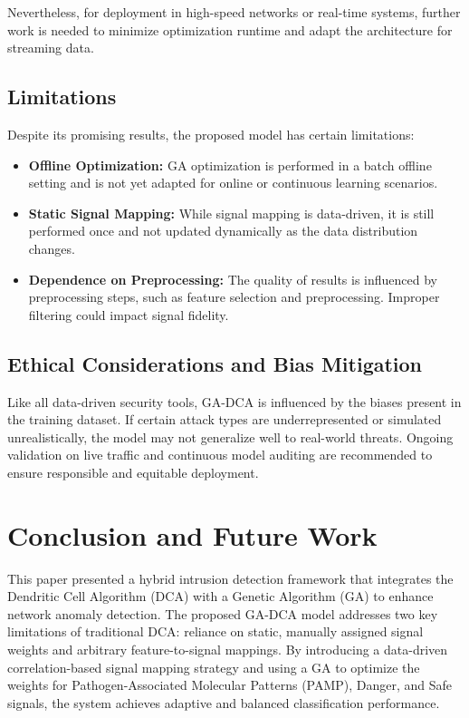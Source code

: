\documentclass[conference]{IEEEtran}
\begin{document}
Nevertheless, for deployment in high-speed networks or real-time
systems, further work is needed to minimize optimization runtime and
adapt the architecture for streaming data.

\subsection{Limitations}

Despite its promising results, the proposed model has certain limitations:

\begin{itemize}
  \item \textbf{Offline Optimization:} GA optimization is performed
    in a batch offline setting and is not yet adapted for online or
    continuous learning scenarios.
  \item \textbf{Static Signal Mapping:} While signal mapping is
    data-driven, it is still performed once and not updated
    dynamically as the data distribution changes.
  \item \textbf{Dependence on Preprocessing:} The quality of results
    is influenced by preprocessing steps, such as feature selection
    and preprocessing. Improper filtering could impact
    signal fidelity.
\end{itemize}

\subsection{Ethical Considerations and Bias Mitigation}

Like all data-driven security tools, GA-DCA is influenced by the
biases present in the training dataset. If certain attack types are
underrepresented or simulated unrealistically, the model may not
generalize well to real-world threats. Ongoing validation on live
traffic and continuous model auditing are recommended to ensure
responsible and equitable deployment.

\section{Conclusion and Future Work}

This paper presented a hybrid intrusion detection framework that
integrates the Dendritic Cell Algorithm (DCA) with a Genetic
Algorithm (GA) to enhance network anomaly detection. The proposed
GA-DCA model addresses two key limitations of traditional DCA:
reliance on static, manually assigned signal weights and arbitrary
feature-to-signal mappings. By introducing a data-driven
correlation-based signal mapping strategy and using a GA to optimize
the weights for Pathogen-Associated Molecular Patterns (PAMP),
Danger, and Safe signals, the system achieves adaptive and balanced
classification performance.
\end{document}
